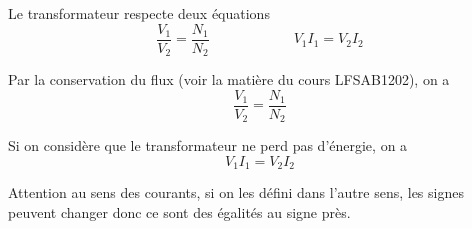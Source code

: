 Le transformateur respecte deux équations
\[\frac{V_1}{V_2} = \frac{N_1}{N_2}\qquad{\qquad{\qquad}}V_1I_1 = V_2I_2\]

Par la conservation du flux (voir la matière du cours LFSAB1202), on a
\[ \frac{V_1}{V_2} = \frac{N_1}{N_2} \]

Si on considère que le transformateur ne perd pas d'énergie, on a
\[ V_1I_1 = V_2I_2 \]

Attention au sens des courants, si on les défini dans l'autre sens, les signes peuvent changer donc ce sont des égalités au signe près.


